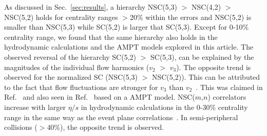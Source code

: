 
As discussed in Sec.~\ref{sec:results}, a hierarchy NSC(5,3) $>$ NSC(4,2) $>$ NSC(5,2) holds for centrality ranges $>20\%$ within the errors and NSC(5,2) is smaller than NSC(5,3) while SC(5,2) is larger that SC(5,3).
Except for 0-10\% centrality range, we found that the same hierarchy also holds in the hydrodynamic calculations and the AMPT models explored in this article.
The observed reversal of the hierarchy SC(5,2) $>$ SC(5,3), can be explained by the magnitudes of the individual flow harmonics ($v_2$ $>$ $v_3$). 
The opposite trend is observed for the normalized SC (NSC(5,3) $>$ NSC(5,2)). This can be attributed to the fact that flow fluctuations are stronger for $v_3$ than $v_2$~\cite{Aad:2013xma}. This was claimed in Ref.~\cite{Zhu:2016puf} and also seen in Ref.~\cite{Bhalerao:2014xra} based on a AMPT model. 
NSC($m$,$n$) correlators increase with larger $\eta/s$ in hydrodynamic calculations in the 0-30\% centrality range in the same way as the event plane correlations~\cite{Bhalerao:2013ina,Teaney:2013dta}. In semi-peripheral collisions ($>$40\%), the opposite trend is observed.


